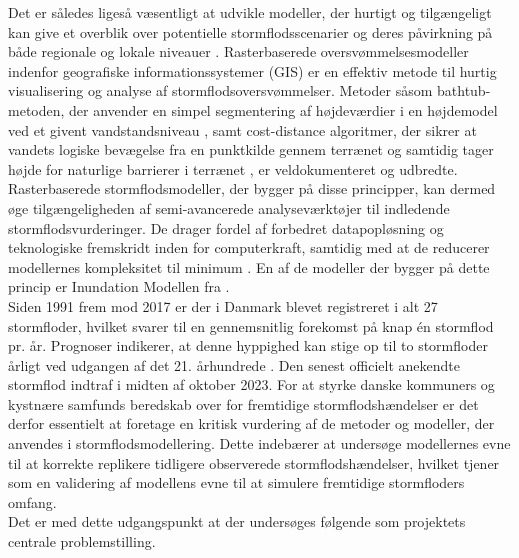 Det er således ligeså væsentligt at udvikle modeller, der hurtigt og tilgængeligt kan give et overblik over potentielle stormflodsscenarier og deres påvirkning på både regionale og lokale niveauer \citep{balstrom_kirby_inundation}. Rasterbaserede oversvømmelsesmodeller indenfor geografiske informationssystemer (GIS) er en effektiv metode til hurtig visualisering og analyse af stormflodsoversvømmelser. Metoder såsom bathtub-metoden, der anvender en simpel segmentering af højdeværdier i en højdemodel ved et givent vandstandsniveau \citep{poulter_raster_2008}, samt cost-distance algoritmer, der sikrer at vandets logiske bevægelse fra en punktkilde gennem terrænet og samtidig tager højde for naturlige barrierer i terrænet \citep{li_delineating_2014}, er veldokumenteret og udbredte.\\
Rasterbaserede stormflodsmodeller, der bygger på disse principper, kan dermed øge tilgængeligheden af semi-avancerede analyseværktøjer til indledende stormflodsvurderinger. De drager fordel af forbedret datapopløsning og teknologiske fremskridt inden for computerkraft, samtidig med at de reducerer modellernes kompleksitet til minimum \citep{balstrom_kirby_inundation, li_delineating_2014}. En af de modeller der bygger på dette princip er Inundation Modellen fra \cite{balstrom_kirby_inundation}.\\

Siden 1991 frem mod 2017 er der i Danmark blevet registreret i alt 27 stormfloder, hvilket svarer til en gennemsnitlig forekomst på knap én stormflod pr. år. Prognoser indikerer, at denne hyppighed kan stige op til to stormfloder årligt ved udgangen af det 21. århundrede \citep{erhvervsministeriet_fremtidige_nodate}. Den senest officielt anekendte stormflod indtraf i midten af oktober 2023. For at styrke danske kommuners og kystnære samfunds beredskab over for fremtidige stormflodshændelser er det derfor essentielt at foretage en kritisk vurdering af de metoder og modeller, der anvendes i stormflodsmodellering. Dette indebærer at undersøge modellernes evne til at korrekte replikere tidligere observerede stormflodshændelser, hvilket tjener som en validering af modellens evne til at simulere fremtidige stormfloders omfang.\\

Det er med dette udgangspunkt at der undersøges følgende som projektets centrale problemstilling. 
\begin{center}
\end{center}

